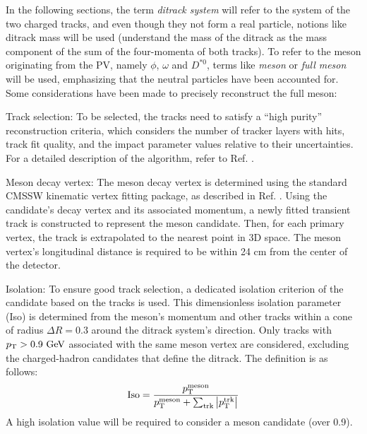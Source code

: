 In the following sections, the term \textit{ditrack system} will refer to the system of the two charged tracks, and even though they not form a real particle, notions like ditrack mass will be used (understand the mass of the ditrack as the mass component of the sum of the four-momenta of both tracks). To refer to the meson originating from the PV, namely $\phi$, $\omega$ and $D^{*0}$, terms like \textit{meson} or \textit{full meson} will be used, emphasizing that the neutral particles have been accounted for. Some considerations have been made to precisely reconstruct the full meson:
\vspace*{-6pt}
\begin{myitemlist}
    \item[Track selection:] To be selected, the tracks need to satisfy a ``high purity'' reconstruction criteria, which considers the number of tracker layers with hits, track fit quality, and the impact parameter values relative to their uncertainties. For a detailed description of the algorithm, refer to Ref. \cite{CMS:2014pgm}.

    \item[Meson decay vertex:] The meson decay vertex is determined using the standard CMSSW \cite{CMSSW} kinematic vertex fitting package, as described in Ref. \cite{Prokofiev:2005zz}. Using the candidate's decay vertex and its associated momentum, a newly fitted transient track is constructed to represent the meson candidate. Then, for each primary vertex, the track is extrapolated to the nearest point in 3D space. The meson vertex's longitudinal distance is required to be within 24 cm from the center of the detector.
    
    \item[Isolation:] To ensure good track selection, a dedicated isolation criterion of the candidate based on the tracks is used. This dimensionless isolation parameter (Iso) is determined from the meson's momentum and other tracks within a cone of radius $\Delta R = 0.3$ around the ditrack system's direction. Only tracks with $p_\text{T} > 0.9\ \text{GeV}$ associated with the same meson vertex are considered, excluding the charged-hadron candidates that define the ditrack. The definition is as follows:
    \begin{equation*}
        \text{Iso} = \frac{p_\text{T}^{\text{meson}}}{p_\text{T}^{\text{meson}}+\sum_{\text{trk}}{\left\lvert p_\text{T}^{\text{trk}}\right\rvert}}
    \end{equation*}
    A high isolation value will be required to consider a meson candidate (over 0.9).


\end{myitemlist}
